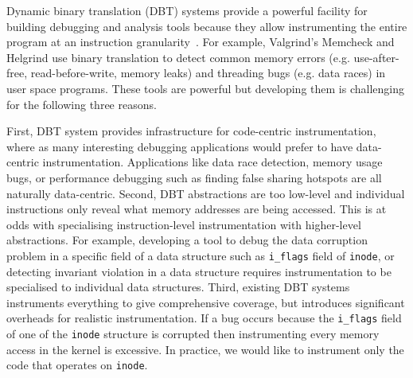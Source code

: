 \documentclass[letterpaper,twocolumn,10pt]{article}
\begin{document}
Dynamic binary translation (DBT) systems provide a powerful facility for building debugging and analysis tools because they allow instrumenting the entire program at an instruction granularity~\cite{DynamoRIOKernel}. For example, Valgrind's Memcheck \cite{Seward:2005:UVD:1247360.1247362} and Helgrind \cite{Muehlenfeld:2007:FDM:1229428.1229457} use binary translation to detect common memory errors (e.g. use-after-free, read-before-write, memory leaks) and threading bugs (e.g. data races) in user space programs. These tools are powerful but developing them is challenging for the following three reasons.

First, DBT system provides infrastructure for code-centric instrumentation, where as many interesting debugging applications would prefer to have data-centric instrumentation. Applications like data race detection, memory usage bugs, or performance debugging such as finding false sharing hotspots are all naturally data-centric.
%
Second, DBT abstractions are too low-level and individual instructions only reveal what memory addresses are being accessed. This is at odds with specialising instruction-level instrumentation with higher-level abstractions. For example, developing a tool to debug the data corruption problem in a specific field of a data structure such as \texttt{i\_flags} field of \texttt{inode}, or detecting invariant violation in a data structure requires instrumentation to be specialised to individual data structures.
Third, existing DBT systems instruments everything to give comprehensive coverage, but introduces significant overheads for realistic instrumentation. If a bug occurs because the \texttt{i\_flags} field of one of the \texttt{inode} structure is corrupted then instrumenting every memory access in the kernel is excessive. In practice, we would like to instrument only the code that operates on \texttt{inode}.
\end{document}
